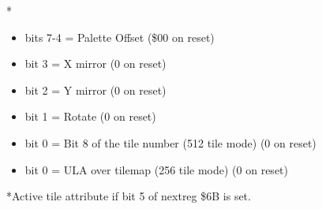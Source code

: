 *
\begin{itemize}
\item bits 7-4 = Palette Offset (\$00 on reset)
\item bit 3 = X mirror (0 on reset)
\item bit 2 = Y mirror (0 on reset)
\item bit 1 = Rotate (0 on reset)
\item bit 0 = Bit 8 of the tile number (512 tile mode) (0 on reset)
\item bit 0 = ULA over tilemap (256 tile mode) (0 on reset)
\end{itemize}
*Active tile attribute if bit 5 of nextreg \$6B is set.

